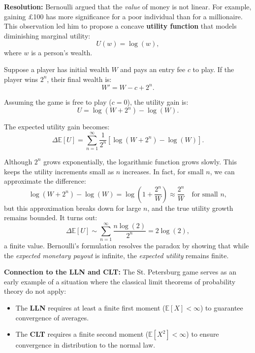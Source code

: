 
\medskip

\noindent
\textbf{Resolution:} 
Bernoulli argued that the \textit{value} of money is not linear. For example, gaining £100 has more significance for a poor individual than for a millionaire. This observation led him to propose a concave \textbf{utility function} that models diminishing marginal utility:
\[
U(w) = \log(w),
\]
where \(w\) is a person's wealth.

\medskip

Suppose a player has initial wealth \(W\) and pays an entry fee \(c\) to play. If the player wins \(2^n\), their final wealth is:
\[
W' = W - c + 2^n.
\]

Assuming the game is free to play (\(c = 0\)), the utility gain is:
\[
U = \log(W + 2^n) - \log(W).
\]

The expected utility gain becomes:
\[
\Delta \mathbb{E}[U] = \sum_{n=1}^{\infty} \frac{1}{2^n} \left[\log(W + 2^n) - \log(W)\right].
\]

Although \(2^n\) grows exponentially, the logarithmic function grows slowly. This keeps the utility increments small as \(n\) increases. In fact, for small \(n\), we can approximate the difference:
\[
\log(W + 2^n) - \log(W) = \log\left(1 + \frac{2^n}{W}\right) \approx \frac{2^n}{W} \quad \text{for small } n,
\]
but this approximation breaks down for large \(n\), and the true utility growth remains bounded. It turns out:
\[
\Delta \mathbb{E}[U] \sim \sum_{n=1}^\infty \frac{n \log(2)}{2^n} = 2 \log(2),
\]
a finite value. Bernoulli’s formulation resolves the paradox by showing that while the \emph{expected monetary payout} is infinite, the \emph{expected utility} remains finite.

\medskip

\noindent
\textbf{Connection to the LLN and CLT:} The St. Petersburg game serves as an early example of a situation where the classical limit theorems of probability theory do not apply:
\begin{itemize}
    \item The \textbf{LLN} requires at least a finite first moment (\( \mathbb{E}[X] < \infty \)) to guarantee convergence of averages.
    \item The \textbf{CLT} requires a finite second moment (\( \mathbb{E}[X^2] < \infty \)) to ensure convergence in distribution to the normal law.
\end{itemize}

